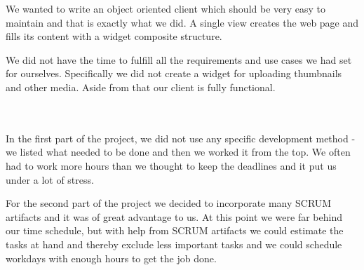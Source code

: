 We wanted to write an object oriented client which should be very easy to maintain and that is exactly what we did. A single view creates the web page and fills its content with a widget composite structure.

We did not have the time to fulfill all the requirements and use cases we had set for ourselves. Specifically we did not create a widget for uploading thumbnails and other media. Aside from that our client is fully functional.

\\
\\
In the first part of the project, we did not use any specific development method - we listed what needed to be done and then we worked it from the top. We often had to work more hours than we thought to keep the deadlines and it put us under a lot of stress.

For the second part of the project we decided to incorporate many SCRUM artifacts and it was of great advantage to us. At this point we were far behind our time schedule, but with help from SCRUM artifacts we could estimate the tasks at hand and thereby exclude less important tasks and we could schedule workdays with enough hours to get the job done.
\newpage